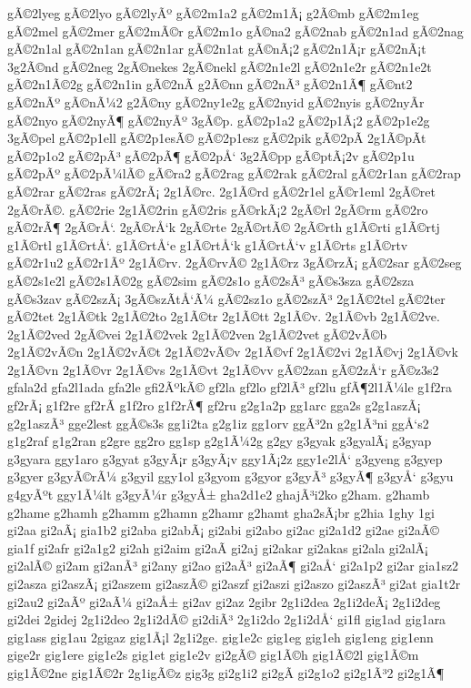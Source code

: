 {gÃ©2lyeg
gÃ©2lyo
gÃ©2lyÃº
gÃ©2m1a2
gÃ©2m1Ã¡
g2Ã©mb
gÃ©2m1eg
gÃ©2mel
gÃ©2mer
gÃ©2mÃ©r
gÃ©2m1o
gÃ©na2
gÃ©2nab
gÃ©2n1ad
gÃ©2nag
gÃ©2n1al
gÃ©2n1an
gÃ©2n1ar
gÃ©2n1at
gÃ©nÃ¡2
gÃ©2n1Ã¡r
gÃ©2nÃ¡t
3g2Ã©nd
gÃ©2neg
2gÃ©nekes
2gÃ©nekl
gÃ©2n1e2l
gÃ©2n1e2r
gÃ©2n1e2t
gÃ©2n1Ã©2g
gÃ©2n1in
gÃ©2nÃ­
g2Ã©nn
gÃ©2nÃ³
gÃ©2n1Ã¶
gÃ©nt2
gÃ©2nÃº
gÃ©nÃ¼2
g2Ã©ny
gÃ©2ny1e2g
gÃ©2nyid
gÃ©2nyis
gÃ©2nyÃ­r
gÃ©2nyo
gÃ©2nyÃ¶
gÃ©2nyÃº
3gÃ©p.
gÃ©2p1a2
gÃ©2p1Ã¡2
gÃ©2p1e2g
3gÃ©pel
gÃ©2p1ell
gÃ©2p1esÃ©
gÃ©2p1esz
gÃ©2pik
gÃ©2pÃ­
2g1Ã©pÃ­t
gÃ©2p1o2
gÃ©2pÃ³
gÃ©2pÃ¶
gÃ©2pÅ‘
3g2Ã©pp
gÃ©ptÃ¡2v
gÃ©2p1u
gÃ©2pÃº
gÃ©2pÃ¼lÃ©
gÃ©ra2
gÃ©2rag
gÃ©2rak
gÃ©2ral
gÃ©2r1an
gÃ©2rap
gÃ©2rar
gÃ©2ras
gÃ©2rÃ¡
2g1Ã©rc.
2g1Ã©rd
gÃ©2r1el
gÃ©r1eml
2gÃ©ret
2gÃ©rÃ©.
gÃ©2rie
2g1Ã©2rin
gÃ©2ris
gÃ©rkÃ¡2
2gÃ©rl
2gÃ©rm
gÃ©2ro
gÃ©2rÃ¶
2gÃ©rÅ‘.
2gÃ©rÅ‘k
2gÃ©rte
2gÃ©rtÃ©
2gÃ©rth
g1Ã©rti
g1Ã©rtj
g1Ã©rtl
g1Ã©rtÅ‘.
g1Ã©rtÅ‘e
g1Ã©rtÅ‘k
g1Ã©rtÅ‘v
g1Ã©rts
g1Ã©rtv
gÃ©2r1u2
gÃ©2r1Ãº
2g1Ã©rv.
2gÃ©rvÃ©
2g1Ã©rz
3gÃ©rzÃ¡
gÃ©2sar
gÃ©2seg
gÃ©2s1e2l
gÃ©2s1Ã©2g
gÃ©2sim
gÃ©2s1o
gÃ©2sÃ³
gÃ©s3sza
gÃ©2sza
gÃ©s3zav
gÃ©2szÃ¡
3gÃ©szÃ­tÅ‘Ã¼
gÃ©2sz1o
gÃ©2szÃ³
2g1Ã©2tel
gÃ©2ter
gÃ©2tet
2g1Ã©tk
2g1Ã©2to
2g1Ã©tr
2g1Ã©tt
2g1Ã©v.
2g1Ã©vb
2g1Ã©2ve.
2g1Ã©2ved
2gÃ©vei
2g1Ã©2vek
2g1Ã©2ven
2g1Ã©2vet
gÃ©2vÃ©b
2g1Ã©2vÃ©n
2g1Ã©2vÃ©t
2g1Ã©2vÃ©v
2g1Ã©vf
2g1Ã©2vi
2g1Ã©vj
2g1Ã©vk
2g1Ã©vn
2g1Ã©vr
2g1Ã©vs
2g1Ã©vt
2g1Ã©vv
gÃ©2zan
gÃ©2zÅ‘r
gÃ©z3s2
gfala2d
gfa2l1ada
gfa2le
gfi2ÃºkÃ©
gf2la
gf2lo
gf2lÃ³
gf2lu
gfÃ¶2l1Ã¼le
g1f2ra
gf2rÃ¡
g1f2re
gf2rÃ­
g1f2ro
g1f2rÃ¶
gf2ru
g2g1a2p
gg1arc
gga2s
g2g1aszÃ¡
g2g1aszÃ³
gge2lest
ggÃ©s3s
gg1i2ta
g2g1iz
gg1orv
ggÃ³2n
g2g1Ã³ni
ggÅ‘s2
g1g2raf
g1g2ran
g2gre
gg2ro
gg1sp
g2g1Ã¼2g
g2gy
g3gyak
g3gyalÃ¡
g3gyap
g3gyara
ggy1aro
g3gyat
g3gyÃ¡r
g3gyÃ¡v
ggy1Ã¡2z
ggy1e2lÅ‘
g3gyeng
g3gyep
g3gyer
g3gyÃ©rÃ¼
g3gyil
ggy1ol
g3gyom
g3gyor
g3gyÃ³
g3gyÃ¶
g3gyÅ‘
g3gyu
g4gyÃºt
ggy1Ã¼lt
g3gyÃ¼r
g3gyÅ±
gha2d1e2
ghajÃ³i2ko
g2ham.
g2hamb
g2hame
g2hamh
g2hamm
g2hamn
g2hamr
g2hamt
gha2sÃ¡br
g2hia
1ghy
1gi
gi2aa
gi2aÃ¡
gia1b2
gi2aba
gi2abÃ¡
gi2abi
gi2abo
gi2ac
gi2a1d2
gi2ae
gi2aÃ©
gia1f
gi2afr
gi2a1g2
gi2ah
gi2aim
gi2aÃ­
gi2aj
gi2akar
gi2akas
gi2ala
gi2alÃ¡
gi2alÃ©
gi2am
gi2anÃ³
gi2any
gi2ao
gi2aÃ³
gi2aÃ¶
gi2aÅ‘
gi2a1p2
gi2ar
gia1sz2
gi2asza
gi2aszÃ¡
gi2aszem
gi2aszÃ©
gi2aszf
gi2aszi
gi2aszo
gi2aszÃ³
gi2at
gia1t2r
gi2au2
gi2aÃº
gi2aÃ¼
gi2aÅ±
gi2av
gi2az
2gibr
2g1i2dea
2g1i2deÃ¡
2g1i2deg
gi2dei
2gidej
2g1i2deo
2g1i2dÃ©
gi2diÃ³
2g1i2do
2g1i2dÅ‘
gi1fl
gig1ad
gig1ara
gig1ass
gig1au
2gigaz
gig1Ã¡l
2g1i2ge.
gig1e2c
gig1eg
gig1eh
gig1eng
gig1enn
gige2r
gig1ere
gig1e2s
gig1et
gig1e2v
gi2gÃ©
gig1Ã©h
gig1Ã©2l
gig1Ã©m
gig1Ã©2ne
gig1Ã©2r
2g1igÃ©z
gig3g
gi2g1i2
gi2gÃ­
gi2g1o2
gi2g1Ã³2
gi2g1Ã¶
}
